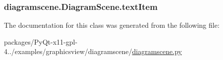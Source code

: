\subsubsection[{text\+Item}]{\setlength{\rightskip}{0pt plus 5cm}diagramscene.\+Diagram\+Scene.\+text\+Item}\label{classdiagramscene_1_1DiagramScene_adb77e28e44cc270067b7d3e6e4f3a267}


The documentation for this class was generated from the following file\+:\begin{DoxyCompactItemize}
\item 
packages/\+Py\+Qt-\/x11-\/gpl-\/4../examples/graphicsview/diagramscene/\hyperlink{diagramscene_8py}{diagramscene.\+py}\end{DoxyCompactItemize}
